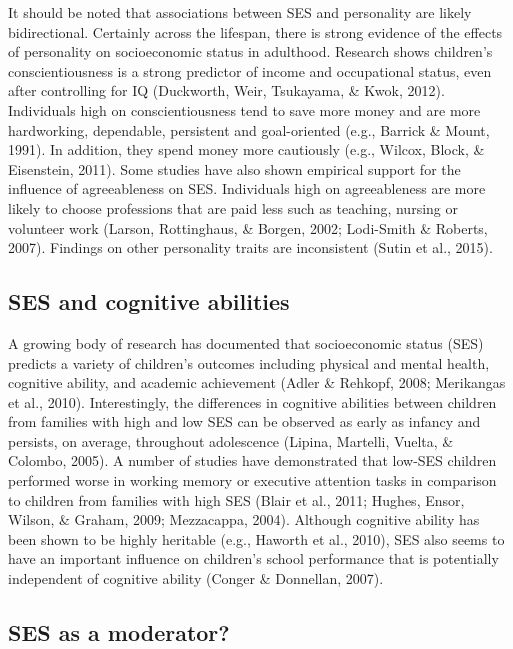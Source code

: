 \documentclass[man]{apa6}
\begin{document}
It should be noted that associations between SES and personality are likely bidirectional. Certainly across the lifespan, there is strong evidence of the effects of personality on socioeconomic status in adulthood. Research shows children's conscientiousness is a strong predictor of income and occupational status, even after controlling for IQ (Duckworth, Weir, Tsukayama, \& Kwok, 2012). Individuals high on conscientiousness tend to save more money and are more hardworking, dependable, persistent and goal-oriented (e.g., Barrick \& Mount, 1991). In addition, they spend money more cautiously (e.g., Wilcox, Block, \& Eisenstein, 2011). Some studies have also shown empirical support for the influence of agreeableness on SES. Individuals high on agreeableness are more likely to choose professions that are paid less such as teaching, nursing or volunteer work (Larson, Rottinghaus, \& Borgen, 2002; Lodi-Smith \& Roberts, 2007). Findings on other personality traits are inconsistent (Sutin et al., 2015).

\hypertarget{ses-and-cognitive-abilities}{%
\subsection{SES and cognitive abilities}\label{ses-and-cognitive-abilities}}

A growing body of research has documented that socioeconomic status (SES) predicts a variety of children's outcomes including physical and mental health, cognitive ability, and academic achievement (Adler \& Rehkopf, 2008; Merikangas et al., 2010). Interestingly, the differences in cognitive abilities between children from families with high and low SES can be observed as early as infancy and persists, on average, throughout adolescence (Lipina, Martelli, Vuelta, \& Colombo, 2005). A number of studies have demonstrated that low-SES children performed worse in working memory or executive attention tasks in comparison to children from families with high SES (Blair et al., 2011; Hughes, Ensor, Wilson, \& Graham, 2009; Mezzacappa, 2004). Although cognitive ability has been shown to be highly heritable (e.g., Haworth et al., 2010), SES also seems to have an important influence on children's school performance that is potentially independent of cognitive ability (Conger \& Donnellan, 2007).

\hypertarget{ses-as-a-moderator}{%
\subsection{SES as a moderator?}\label{ses-as-a-moderator}}
\end{document}
